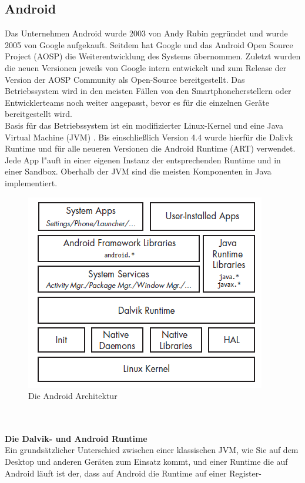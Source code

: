 \subsection{Android}
	Das Unternehmen Android wurde 2003 von Andy Rubin gegründet und wurde 2005 von
	Google aufgekauft. Seitdem hat Google und das Android Open Source Project
	(AOSP) die Weiterentwicklung des Systems übernommen. Zuletzt wurden die neuen
	Versionen jeweils von Google intern entwickelt und zum Release der Version der
	AOSP Community als Open-Source bereitgestellt. Das Betriebssystem wird in den
	meisten Fällen von den Smartphoneherstellern oder Entwicklerteams noch weiter
	angepasst, bevor es für die einzelnen Geräte bereitgestellt wird.\\
	Basis für das Betriebssystem ist ein modifizierter Linux-Kernel und eine Java
	Virtual Machine (JVM) \cite{ArtDalvik}. Bis einschließlich Version 4.4 wurde
	hierfür die Dalivk Runtime und für alle neueren Versionen die Android Runtime
	(ART) verwendet. Jede App l"auft in einer eigenen Instanz der entsprechenden
	Runtime und in einer Sandbox. Oberhalb der JVM sind die meisten Komponenten in
	Java implementiert.
	\begin{figure}[h]
		\centering
		\includegraphics[width=0.7\linewidth]{android_pages/graphics/architektur_android_.png}
		\caption{Die Android Architektur \protect\cite[S. 2]{Elenkov2014} }
		\label{fig:architektur_android}
	\end{figure}
	\\\\
	\textbf{Die Dalvik- und Android Runtime}\\
	Ein grundsätzlicher Unterschied zwischen einer klassischen JVM, wie Sie auf
	dem Desktop und anderen Geräten zum Einsatz kommt, und einer Runtime die auf
	Android läuft ist der, dass auf Android die Runtime auf einer Register-
